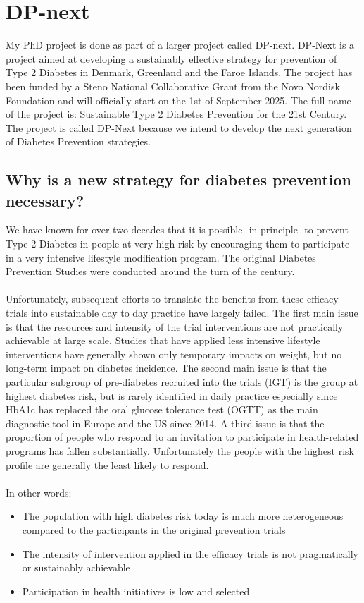 \documentclass[11pt]{article}
\author{Hjalte Søberg Mikkelsen}
\date{\today}
\title{}
\begin{document}
\tableofcontents


\section{DP-next}
\label{sec:orgb149435}
My PhD project is done as part of a larger project called DP-next. DP-Next is a project aimed at
developing a sustainably effective strategy for prevention of Type 2 Diabetes in Denmark, Greenland
and the Faroe Islands. The project has been funded by a Steno National Collaborative Grant from the
Novo Nordisk Foundation and will officially start on the 1st of September 2025. The full name of the
project is: Sustainable Type 2 Diabetes Prevention for the 21st Century. The project is called DP-Next
because we intend to develop the next generation of Diabetes Prevention strategies.

\subsection{Why is a new strategy for diabetes prevention necessary?}
\label{sec:org1e3e6e8}
We have known for over two decades that it is possible -in principle- to prevent Type 2 Diabetes in
people at very high risk by encouraging them to participate in a very intensive lifestyle modification
program. The original Diabetes Prevention Studies were conducted around the turn of the century.\\[0pt]
\\[0pt]
Unfortunately, subsequent efforts to translate the benefits from these efficacy trials into sustainable
day to day practice have largely failed. The first main issue is that the resources and intensity of the
trial interventions are not practically achievable at large scale. Studies that have applied less
intensive lifestyle interventions have generally shown only temporary impacts on weight, but no
long-term impact on diabetes incidence. The second main issue is that the particular subgroup of
pre-diabetes recruited into the trials (IGT) is the group at highest diabetes risk, but is rarely
identified in daily practice especially since HbA1c has replaced the oral glucose tolerance test
(OGTT) as the main diagnostic tool in Europe and the US since 2014. A third issue is that the
proportion of people who respond to an invitation to participate in health-related programs has
fallen substantially. Unfortunately the people with the highest risk profile are generally the least
likely to respond.\\[0pt]
\\[0pt]
In other words:
\begin{itemize}
\item The population with high diabetes risk today is much more heterogeneous compared to the participants in the original prevention trials
\item The intensity of intervention applied in the efficacy trials is not pragmatically or sustainably achievable
\item Participation in health initiatives is low and selected
\end{itemize}
\end{document}
